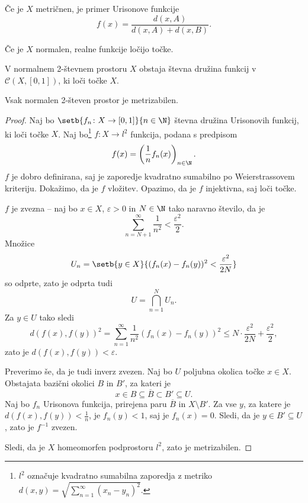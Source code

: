 \begin{opomba}
Če je $X$ metričnen, je primer Urisonove funkcije
\[
f(x) = \frac{d(x,A)}{d(x,A) + d(x,B)}.
\]
\end{opomba}

\begin{posledica}
Če je $X$ normalen, realne funkcije ločijo točke.
\end{posledica}

\begin{posledica}
V normalnem 2-števnem prostoru $X$ obstaja števna družina funkcij v
$\mathcal{C}(X,[0,1])$, ki loči točke $X$.
\end{posledica}

\begin{izrek}[Urison]
Vsak normalen 2-števen prostor je metrizabilen.
\end{izrek}

\begin{proof}
Naj bo $\setb{f_n \colon X \to [0,1]}{n \in \N}$ števna družina
Urisonovih funkcij, ki loči točke $X$. Naj bo\footnote{$l^2$
označuje kvadratno sumabilna zaporedja z metriko
$d(x,y) = \displaystyle \sqrt{\sum_{n=1}^\infty (x_n-y_n)^2}$.}
$f \colon X \to l^2$ funkcija, podana s predpisom
\[
f(x) = \left(\frac{1}{n} f_n(x)\right)_{n \in \N}.
\]
$f$ je dobro definirana, saj je zaporedje kvadratno sumabilno po
Weierstrassovem kriteriju. Dokažimo, da je $f$ vložitev. Opazimo,
da je $f$ injektivna, saj loči točke.

$f$ je zvezna -- naj bo $x \in X$, $\varepsilon > 0$ in $N \in \N$
tako naravno število, da je
\[
\sum_{n=N+1}^\infty \frac{1}{n^2} < \frac{\varepsilon^2}{2}.
\]
Množice
\[
U_n = \setb{y \in X}{(f_n(x)-f_n(y))^2 < \frac{\varepsilon^2}{2N}}
\]
so odprte, zato je odprta tudi
\[
U = \bigcap_{n=1}^N U_n.
\]
Za $y \in U$ tako sledi
\[
d(f(x),f(y))^2 =
\sum_{n=1}^\infty \frac{1}{n^2} (f_n(x)-f_n(y))^2 \leq
N \cdot \frac{\varepsilon^2}{2N} + \frac{\varepsilon^2}{2},
\]
zato je $d(f(x),f(y)) < \varepsilon$.

Preverimo še, da je tudi inverz zvezen. Naj bo $U$ poljubna okolica
točke $x \in X$. Obstajata bazični okolici $B$ in $B'$, za kateri
je
\[
x \in B \subseteq \overline{B} \subset B' \subseteq U.
\]
Naj bo $f_n$ Urisonova funkcija, prirejena paru $\overline{B}$ in
$X \setminus B'$. Za vse $y$, za katere je
$d(f(x),f(y)) < \frac{1}{n}$, je $f_n(y) < 1$, saj je $f_n(x) = 0$.
Sledi, da je $y \in B' \subseteq U$, zato je $f^{-1}$ zvezen.

Sledi, da je $X$ homeomorfen podprostoru $l^2$, zato je
metrizabilen.
\end{proof}

